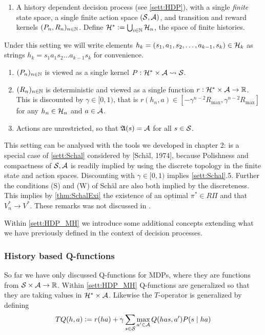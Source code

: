 \begin{sett}
  \leavevmode
  \begin{enumerate}
    \item A history dependent decision process (see \cref{sett:HDP}),
      with a single \emph{finite} state space,
      a single finite action space $(\mathcal{S}, \mathcal{A})$,
      and transition and reward kernels $(P_n, R_n)_{n \in \mathbb{N}}$.
      Define $\mathcal{H}^* \vcentcolon= \bigcup_{i \in \mathbb{N}} \mathcal{H}_n$,
      the space of finite histories.
  \end{enumerate}
  Under this setting we will write elements
  $h_k = (s_1, a_1, s_2, \dots, a_{k-1}, s_k) \in \mathcal{H}_k$
  as strings $h_k = s_1 a_1 s_2 \dots a_{k-1} s_k$ for convenience.
  \begin{enumerate}[resume]
    \item $(P_n)_{n \in \mathbb{N}}$ is viewed as a single kernel
      $P : \mathcal{H}^* \times \mathcal{A} \leadsto \mathcal{S}$.
    \item $(R_n)_{n \in \mathbb{N}}$ is deterministic and viewed as a single function
      $r : \mathcal{H}^* \times \mathcal{A} \to \mathbb{R}$.
      This is discounted by $\gamma \in [0,1)$, that is 
      $r(h_n, a) \in [-\gamma^{n-2}R_{\max}, \gamma^{n-2} R_{\max}]$ for any
    $h_n \in \mathcal{H}_n$ and $a \in \mathcal{A}$.
    \item Actions are unrestricted, so that
      $\frak{A}(s) = \mathcal{A}$ for all $s \in \mathcal{S}$.
  \end{enumerate}
  \label{sett:HDP_MH}
\end{sett}

\begin{rem}
  This setting can be analysed with the tools we developed in chapter 2:
   is a special case of
  \cref{sett:Schal} considered by [Schäl, 1974],
  because Polishness and compactness of $\mathcal{S}, \mathcal{A}$ is readily
  implied by using the discrete topology in the finite state and action
  spaces. Discounting with $\gamma \in [0,1)$
  implies \cref{sett:Schal}.5.
  Further the conditions (S) and (W) of Schäl are also both implied by
  the discreteness.
  This implies by \cref{thm:SchalExi} the existence of an optimal
  $\pi^* \in R\Pi$ and that $V^*_n \to V^*$.
  These remarks was not discussed in .
\end{rem}

Within \cref{sett:HDP_MH} we introduce some additional concepts extending
what we have previously defined in the context of decision processes.

\subsubsection{History based Q-functions}
So far we have only discussed Q-functions for MDPs,
where they are functions from $\mathcal{S} \times \mathcal{A} \to \mathbb{R}$.
Within \cref{sett:HDP_MH} Q-functions are generalized so that
they are taking values in $\mathcal{H}^* \times \mathcal{A}$.
Likewise the $T$-operator is generalized by defining
\begin{equation}
  TQ(h, a) \vcentcolon= r(ha) +
  \gamma \sum_{s\in\mathcal{S}} \max_{a' \in \mathcal{A}} Q(has, a') P(s \mid ha)
  \label{eq:MH_Q_def}
\end{equation}

